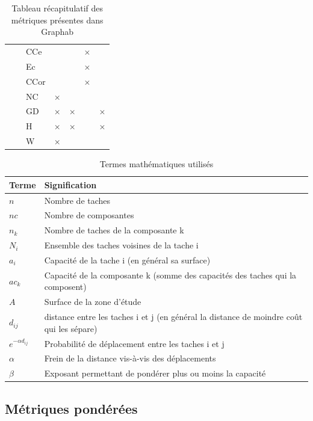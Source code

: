 \documentclass{article}
\begin{document}
\begin{table}[H]
\begin{tabular}{|c|p{7cm}|l|c|c|c|c|}
		& \nameref{metric_CCe} & CCe &  &  & × & \\
		& \nameref{metric_Ec} & Ec &  &  & × & \\
		& \nameref{metric_CCor} & CCor &  &  & × & \\
		& \nameref{metric_NC} & NC & × &  &  & \\
		& \nameref{metric_GD} & GD & × & × &  & ×\\
		& \nameref{metric_H} & H & × & × &  & ×\\
		& \nameref{metric_W} & W & × &  &  & \\
		\hline
	\end{tabular}
	\caption{Tableau récapitulatif des métriques présentes dans Graphab}
\end{table}



\begin{table}[H]
\begin{tabular}{|m{3.24cm}|m{12.604cm}|}
\hline
Terme &
Signification\\\hline
$
n
$
 &
Nombre de taches\\\hline
$
\mathit{nc}
$
 &
Nombre de composantes\\\hline
$
{n}_{k}
$
 &
Nombre de taches de la composante k\\\hline
$
{N}_{i}
$
 &
Ensemble des taches voisines de la tache i\\\hline
$
{a}_{i}\text{~}
$
 &
Capacité de la tache i (en général sa surface)\\\hline
$
{\mathit{ac}}_{k}
$
 &
Capacité de la composante k (somme des capacités des taches qui la composent)\\\hline
$
A
$
 &
Surface de la zone d’étude\\\hline
$
{d}_{\mathit{ij}}\text{~}
$
 &
distance entre les taches i et j (en général la distance de moindre coût qui les sépare)\\\hline
$
{e}^{-\alpha {d}_{\mathit{ij}}}\text{~}
$
 &
Probabilité de déplacement entre les taches i et j\\\hline
$
\alpha 
$
 &
Frein de la distance vis-à-vis des déplacements\\\hline
$
\beta 
$
 &
Exposant permettant de pondérer plus ou moins la capacité\\\hline
\end{tabular}
\caption{Termes mathématiques utilisés}
\end{table}


\subsection{Métriques pondérées}
\end{document}

